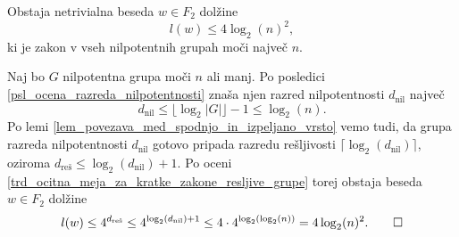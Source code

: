 \begin{izrek}\label{izr_glavni_nilpotentne}
    Obstaja netrivialna beseda $w \in F_2$ dolžine \begin{equation*}
    l(w) \le  4 \log_2(n)^2,
 \end{equation*}
 ki je zakon v vseh nilpotentnih grupah moči največ $n$. 
\end{izrek}
\begin{dokaz}
    Naj bo $G$ nilpotentna grupa moči $n$ ali manj. Po posledici \ref{psl_ocena_razreda_nilpotentnosti} znaša njen razred nilpotentnosti $d_{\text{nil}}$ največ \begin{equation*}
        d_{\text{nil}} \le \lfloor \log_2 \lvert G \rvert \rfloor - 1 \le \log_2(n).
    \end{equation*}
    Po lemi \ref{lem_povezava_med_spodnjo_in_izpeljano_vrsto} vemo tudi, da grupa razreda nilpotentnosti $d_{\text{nil}}$ gotovo pripada razredu rešljivosti $\lceil \log_2(d_{\text{nil}}) \rceil$, oziroma $d_{\text{reš}}  \le \log_2(d_{\text{nil}}) + 1$.
    Po oceni \ref{trd_ocitna_meja_za_kratke_zakone_resljive_grupe} torej obstaja beseda $w \in F_2$ dolžine \begin{equation*}
        l(w) \le 4^{d_{\text{reš}}} \le  4^{\log_2(d_{\text{nil}}) + 1}  \le 4 \cdot 4^{\log_2(\log_2(n))} = 4 \log_2(n)^2. \qedhere 
    \end{equation*} 
\end{dokaz}

